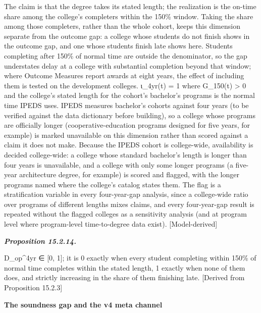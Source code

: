 \documentclass[
]{article}
\begin{document}
The claim is that the degree takes its stated length; the realization is
the on-time share among the college's completers within the 150\%
window. Taking the share among those completers, rather than the whole
cohort, keeps this dimension separate from the outcome gap: a college
whose students do not finish shows in the outcome gap, and one whose
students finish late shows here. Students completing after 150\% of
normal time are outside the denominator, so the gap understates delay at
a college with substantial completion beyond that window; where Outcome
Measures report awards at eight years, the effect of including them is
tested on the development colleges. ι\_4yr(t) = 1 where G\_150(t)
\textgreater{} 0 and the college's stated length for the cohort's
bachelor's programs is the normal time IPEDS uses. IPEDS measures
bachelor's cohorts against four years (to be verified against the data
dictionary before building), so a college whose programs are officially
longer (cooperative-education programs designed for five years, for
example) is marked unavailable on this dimension rather than scored
against a claim it does not make. Because the IPEDS cohort is
college-wide, availability is decided college-wide: a college whose
standard bachelor's length is longer than four years is unavailable, and
a college with only some longer programs (a five-year architecture
degree, for example) is scored and flagged, with the longer programs
named where the college's catalog states them. The flag is a
stratification variable in every four-year-gap analysis, since a
college-wide ratio over programs of different lengths mixes claims, and
every four-year-gap result is repeated without the flagged colleges as a
sensitivity analysis (and at program level where program-level
time-to-degree data exist). {[}Model-derived{]}

\emph{\textbf{Proposition 15.2.14.}}

D\_op\^{}4yr ∈ {[}0, 1{]}; it is 0 exactly when every student completing
within 150\% of normal time completes within the stated length, 1
exactly when none of them does, and strictly increasing in the share of
them finishing late. {[}Derived from Proposition 15.2.3{]}

\textbf{The soundness gap and the v4 meta channel}
\end{document}
